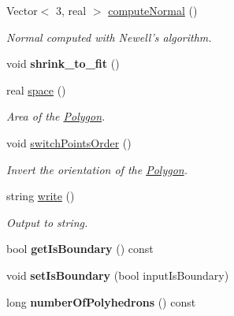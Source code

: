 \begin{DoxyCompactItemize}
\item 
\-Vector$<$ 3, real $>$ \hyperlink{class_polygon_aa12bdc3f0990036909241a3294ca90ae}{compute\-Normal} ()
\begin{DoxyCompactList}\small\item\em \-Normal computed with \-Newell's algorithm. \end{DoxyCompactList}\item 
\hypertarget{class_polygon_af63fd7046132c422a90c52c3fc092cb3}{void {\bfseries shrink\-\_\-to\-\_\-fit} ()}\label{class_polygon_af63fd7046132c422a90c52c3fc092cb3}

\item 
real \hyperlink{class_polygon_ae119dd09d659fc1255fcfa1c45659a51}{space} ()
\begin{DoxyCompactList}\small\item\em \-Area of the \hyperlink{class_polygon}{\-Polygon}. \end{DoxyCompactList}\item 
\hypertarget{class_polygon_aad5a195054aa08f073e59ea907bd5d60}{void \hyperlink{class_polygon_aad5a195054aa08f073e59ea907bd5d60}{switch\-Points\-Order} ()}\label{class_polygon_aad5a195054aa08f073e59ea907bd5d60}

\begin{DoxyCompactList}\small\item\em \-Invert the orientation of the \hyperlink{class_polygon}{\-Polygon}. \end{DoxyCompactList}\item 
string \hyperlink{class_polygon_ac36032b05bfac321af17c5992de2deae}{write} ()
\begin{DoxyCompactList}\small\item\em \-Output to string. \end{DoxyCompactList}\item 
\hypertarget{class_polygon_a25bd0bca4495328793bdf0938bc26e1b}{bool {\bfseries get\-Is\-Boundary} () const }\label{class_polygon_a25bd0bca4495328793bdf0938bc26e1b}

\item 
\hypertarget{class_polygon_ab1dd3c0dbe875da0e34e16e4b37f8ab0}{void {\bfseries set\-Is\-Boundary} (bool input\-Is\-Boundary)}\label{class_polygon_ab1dd3c0dbe875da0e34e16e4b37f8ab0}

\item 
\hypertarget{class_polygon_ac5c64f6a2369301bf7f542c0543798f0}{long {\bfseries number\-Of\-Polyhedrons} () const }\label{class_polygon_ac5c64f6a2369301bf7f542c0543798f0}


\end{DoxyCompactItemize}
